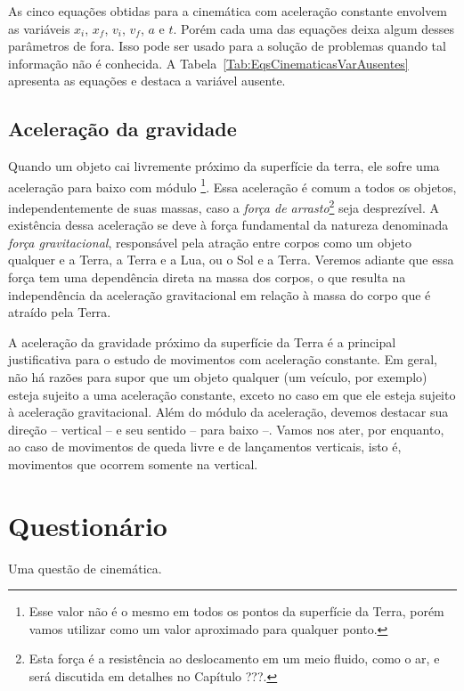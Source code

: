 As cinco equações obtidas para a cinemática com aceleração constante envolvem as variáveis $x_i$, $x_f$, $v_i$, $v_f$, $a$ e $t$. Porém cada uma das equações deixa algum desses parâmetros de fora. Isso pode ser usado para a solução de problemas quando tal informação não é conhecida. A Tabela~\ref{Tab:EqsCinematicasVarAusentes} apresenta as equações e destaca a variável ausente.

\subsection{Aceleração da gravidade}

Quando um objeto cai livremente próximo da superfície da terra, ele sofre uma aceleração para baixo com módulo \footnote{Esse valor não é o mesmo em todos os pontos da superfície da Terra, porém vamos utilizar  como um valor aproximado para qualquer ponto.}. Essa aceleração é comum a todos os objetos, independentemente de suas massas, caso a \emph{força de arrasto}\footnote{Esta força é a resistência ao deslocamento em um meio fluido, como o ar, e será discutida em detalhes no Capítulo ???.} seja desprezível. A existência dessa aceleração se deve à força fundamental da natureza denominada \emph{força gravitacional}, responsável pela atração entre corpos como um objeto qualquer e a Terra, a Terra e a Lua, ou o Sol e a Terra. Veremos adiante que essa força tem uma dependência direta na massa dos corpos, o que resulta na independência da aceleração gravitacional em relação à massa do corpo que é atraído pela Terra.

A aceleração da gravidade próximo da superfície da Terra é a principal justificativa para o estudo de movimentos com aceleração constante. Em geral, não há razões para supor que um objeto qualquer (um veículo, por exemplo) esteja sujeito a uma aceleração constante, exceto no caso em que ele esteja sujeito à aceleração gravitacional. Além do módulo da aceleração, devemos destacar sua direção -- vertical -- e seu sentido -- para baixo --. Vamos nos ater, por enquanto, ao caso de movimentos de queda livre e de lançamentos verticais, isto é, movimentos que ocorrem somente na vertical.

\section{Questionário}

\begin{question}[type={exam}]
Uma questão de cinemática.
\end{question}

